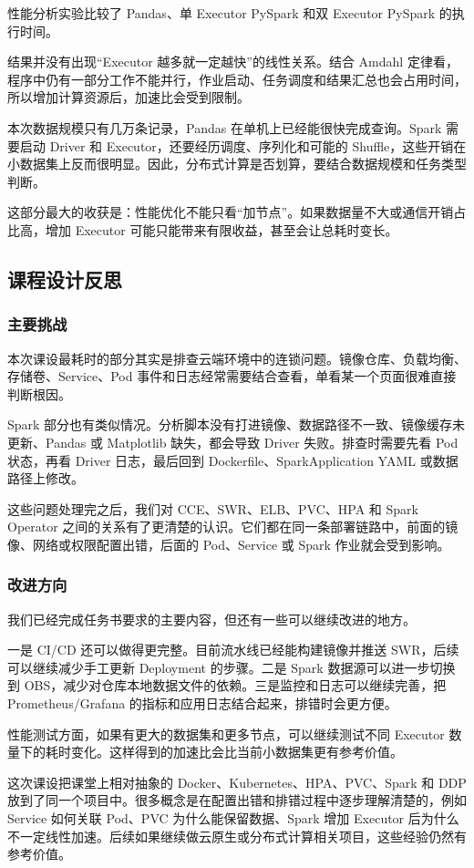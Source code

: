 性能分析实验比较了 Pandas、单 Executor PySpark 和双 Executor PySpark 的执行时间。

结果并没有出现“Executor 越多就一定越快”的线性关系。结合 Amdahl 定律看，程序中仍有一部分工作不能并行，作业启动、任务调度和结果汇总也会占用时间，所以增加计算资源后，加速比会受到限制。

本次数据规模只有几万条记录，Pandas 在单机上已经能很快完成查询。Spark 需要启动 Driver 和 Executor，还要经历调度、序列化和可能的 Shuffle，这些开销在小数据集上反而很明显。因此，分布式计算是否划算，要结合数据规模和任务类型判断。

这部分最大的收获是：性能优化不能只看“加节点”。如果数据量不大或通信开销占比高，增加 Executor 可能只能带来有限收益，甚至会让总耗时变长。

\subsection{课程设计反思}

\subsubsection{主要挑战}

本次课设最耗时的部分其实是排查云端环境中的连锁问题。镜像仓库、负载均衡、存储卷、Service、Pod 事件和日志经常需要结合查看，单看某一个页面很难直接判断根因。

Spark 部分也有类似情况。分析脚本没有打进镜像、数据路径不一致、镜像缓存未更新、Pandas 或 Matplotlib 缺失，都会导致 Driver 失败。排查时需要先看 Pod 状态，再看 Driver 日志，最后回到 Dockerfile、SparkApplication YAML 或数据路径上修改。

这些问题处理完之后，我们对 CCE、SWR、ELB、PVC、HPA 和 Spark Operator 之间的关系有了更清楚的认识。它们都在同一条部署链路中，前面的镜像、网络或权限配置出错，后面的 Pod、Service 或 Spark 作业就会受到影响。

\subsubsection{改进方向}

我们已经完成任务书要求的主要内容，但还有一些可以继续改进的地方。

一是 CI/CD 还可以做得更完整。目前流水线已经能构建镜像并推送 SWR，后续可以继续减少手工更新 Deployment 的步骤。二是 Spark 数据源可以进一步切换到 OBS，减少对仓库本地数据文件的依赖。三是监控和日志可以继续完善，把 Prometheus/Grafana 的指标和应用日志结合起来，排错时会更方便。

性能测试方面，如果有更大的数据集和更多节点，可以继续测试不同 Executor 数量下的耗时变化。这样得到的加速比会比当前小数据集更有参考价值。

这次课设把课堂上相对抽象的 Docker、Kubernetes、HPA、PVC、Spark 和 DDP 放到了同一个项目中。很多概念是在配置出错和排错过程中逐步理解清楚的，例如 Service 如何关联 Pod、PVC 为什么能保留数据、Spark 增加 Executor 后为什么不一定线性加速。后续如果继续做云原生或分布式计算相关项目，这些经验仍然有参考价值。
